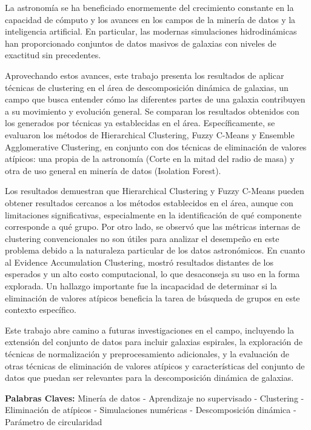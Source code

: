 La astronomía se ha beneficiado enormemente del crecimiento constante en la capacidad de cómputo y los avances en los campos de la minería de datos y la inteligencia artificial. En particular, las modernas simulaciones hidrodinámicas han proporcionado conjuntos de datos masivos de galaxias con niveles de exactitud sin precedentes.

Aprovechando estos avances, este trabajo presenta los resultados de aplicar técnicas de clustering en el área de descomposición dinámica de galaxias, un campo que busca entender cómo las diferentes partes de una galaxia contribuyen a su movimiento y evolución general. Se comparan los resultados obtenidos con los generados por técnicas ya establecidas en el área. Específicamente, se evaluaron los métodos de Hierarchical Clustering, Fuzzy C-Means y Ensemble Agglomerative Clustering, en conjunto con dos técnicas de eliminación de valores atípicos: una propia de la astronomía (Corte en la mitad del radio de masa) y otra de uso general en minería de datos (Isolation Forest).

Los resultados demuestran que Hierarchical Clustering y Fuzzy C-Means pueden obtener resultados cercanos a los métodos establecidos en el área, aunque con limitaciones significativas, especialmente en la identificación de qué componente corresponde a qué grupo. Por otro lado, se observó que las métricas internas de clustering convencionales no son útiles para analizar el desempeño en este problema debido a la naturaleza particular de los datos astronómicos. En cuanto al Evidence Accumulation Clustering, mostró resultados distantes de los esperados y un alto costo computacional, lo que desaconseja su uso en la forma explorada. Un hallazgo importante fue la incapacidad de determinar si la eliminación de valores atípicos beneficia la tarea de búsqueda de grupos en este contexto específico.

Este trabajo abre camino a futuras investigaciones en el campo, incluyendo la extensión del conjunto de datos para incluir galaxias espirales, la exploración de técnicas de normalización y preprocesamiento adicionales, y la evaluación de otras técnicas de eliminación de valores atípicos y características del conjunto de datos que puedan ser relevantes para la descomposición dinámica de galaxias.

\vfill

\textbf{Palabras Claves:} Minería de datos - Aprendizaje no supervisado - Clustering - Eliminación de atípicos - Simulaciones numéricas - Descomposición dinámica - Parámetro de circularidad